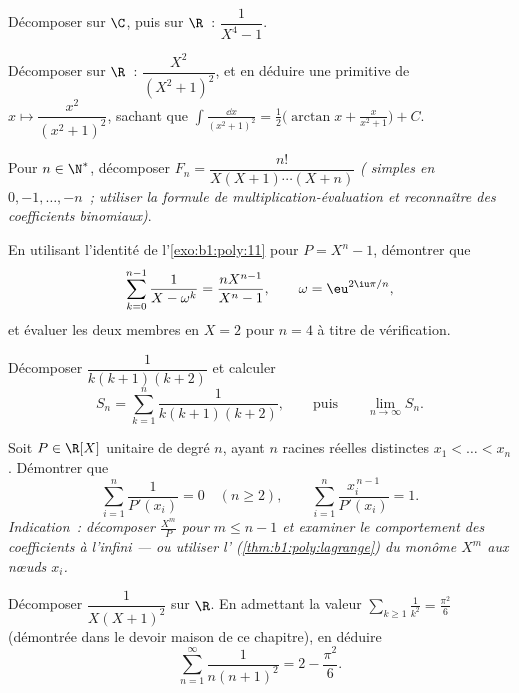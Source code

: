 \begin{exercise}[$\star\star$]\label{exo:b1:fractions:4}
Décomposer sur $\C$, puis sur $\R$~: $\dfrac{1}{X^4 - 1}$.
\end{exercise}

\begin{exercise}[$\star\star$]\label{exo:b1:fractions:5}
Décomposer sur $\R$~: $\dfrac{X^2}{(X^2 + 1)^2}$, et en déduire une
primitive de $x \mapsto \dfrac{x^2}{(x^2+1)^2}$, sachant que
$\int \frac{\dd x}{(x^2+1)^2} = \frac12\bigl(\arctan x +
\frac{x}{x^2+1}\bigr) + C$.
\end{exercise}

\begin{exercise}[$\star\star$]\label{exo:b1:fractions:6}
Pour $n \in \N^*$, décomposer $F_n = \dfrac{n!}{X(X+1)\cdots(X+n)}$
\emph{( simples en $0, -1, \dots, -n$~; utiliser la formule de
multiplication-évaluation et reconnaître des coefficients binomiaux)}.
\end{exercise}

\begin{exercise}[$\star\star$]\label{exo:b1:fractions:7}
En utilisant l'identité de l'\cref{exo:b1:poly:11} pour $P = X^n - 1$,
démontrer que
\[
\sum_{k=0}^{n-1} \frac{1}{X - \omega^k} = \frac{n X^{n-1}}{X^n - 1},
\qquad \omega = \eu^{2\iu\pi/n},
\]
et évaluer les deux membres en $X = 2$ pour $n = 4$ à titre de
vérification.
\end{exercise}

\begin{exercise}[$\star\star$]\label{exo:b1:fractions:8}
Décomposer $\dfrac{1}{k(k+1)(k+2)}$ et calculer
\[
S_n = \sum_{k=1}^{n} \frac{1}{k(k+1)(k+2)},
\qquad\text{puis}\qquad
\lim_{n \to \infty} S_n .
\]
\end{exercise}

\begin{exercise}[$\star\star\star$]\label{exo:b1:fractions:9}
Soit $P \in \R[X]$ unitaire de degré $n$, ayant $n$ racines réelles
distinctes $x_1 < \dots < x_n$. Démontrer que
\[
\sum_{i=1}^{n} \frac{1}{P'(x_i)} = 0 \quad (n \geq 2),
\qquad
\sum_{i=1}^{n} \frac{x_i^{\,n-1}}{P'(x_i)} = 1 .
\]
\emph{Indication~: décomposer $\frac{X^m}{P}$ pour $m \leq n - 1$ et
examiner le comportement des coefficients à l'infini --- ou utiliser
l' (\cref{thm:b1:poly:lagrange}) du monôme
$X^m$ aux nœuds $x_i$.}
\end{exercise}

\begin{exercise}[$\star\star$]\label{exo:b1:fractions:10}
Décomposer $\dfrac{1}{X(X+1)^2}$ sur $\R$. En admettant la valeur
$\sum_{k \geq 1} \frac1{k^2} = \frac{\pi^2}6$ (démontrée dans le devoir
maison de ce chapitre), en déduire
\[
\sum_{n=1}^{\infty} \frac{1}{n(n+1)^2} = 2 - \frac{\pi^2}{6} .
\]
\end{exercise}


